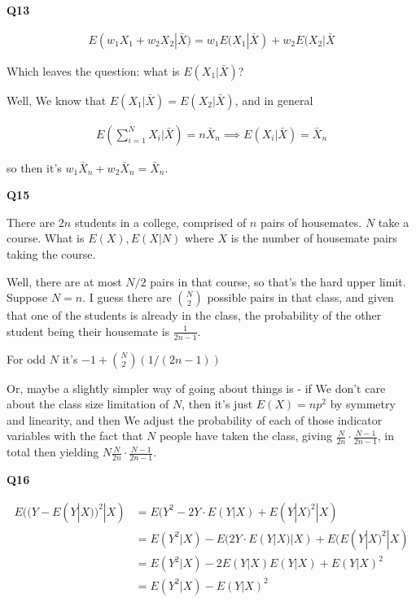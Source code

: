 \documentclass{article}
\begin{document}
			\hfill
		
		\textbf{Q13}
		
			\begin{align*}
			E(w_1X_1 + w_2X_2|\bar{X}) = w_1E(X_1|\bar{X}) + w_2E(X_2|\bar{X}
			\end{align*}
		
			Which leaves the question: what is $E(X_1|\bar{X})$?
			
			Well, We know that $E(X_1|\bar{X}) = E(X_2|\bar{X})$, and in general
			
			\begin{align*}
			E\left(\sum^N_{i=1} X_i|\bar{X} \right) = n\bar{X}_n \implies E(X_i|\bar{X}) = \bar{X}_n
			\end{align*}
			
			so then it's $w_1\bar{X}_n+w_2\bar{X}_n = \bar{X}_n$.
		
			\hfill
			
		\textbf{Q15}
		
			There are $2n$ students in a college, comprised of $n$ pairs of housemates. $N$ take a course. What is $E(X), E(X|N)$ where $X$ is the number of housemate pairs taking the course.
			
			Well, there are at most $N/2$ pairs in that course, so that's the hard upper limit. Suppose $N=n$. I guess there are ${N\choose 2}$ possible pairs in that class, and given that one of the students is already in the class, the probability of the other student being their housemate is $\frac{1}{2n-1}$.
			
			For odd $N$ it's $-1 + {N\choose 2}(1/(2n-1))$
		
			Or, maybe a slightly simpler way of going about things is - if We don't care about the class size limitation of $N$, then it's just $E(X) = np^2$ by symmetry and linearity, and then We adjust the probability of each of those indicator variables with the fact that $N$ people have taken the class, giving $\frac{N}{2n}\cdot\frac{N-1}{2n-1}$, in total then yielding $N\frac{N}{2n}\cdot\frac{N-1}{2n-1}$.
			
			\hfill
			
		\textbf{Q16}
		
			\begin{align*}
			E((Y-E(Y|X))^2|X) &= E(Y^2 - 2Y\cdot E(Y|X) + E(Y|X)^2  |X)\\
			&= E(Y^2|X) - E(2Y\cdot E(Y|X)|X) + E(E(Y|X)^2|X)\\
			&= E(Y^2|X) - 2E(Y|X)E(Y|X) + E(Y|X)^2\\
			&=E(Y^2|X) - E(Y|X)^2
			\end{align*}
				
\end{document}
